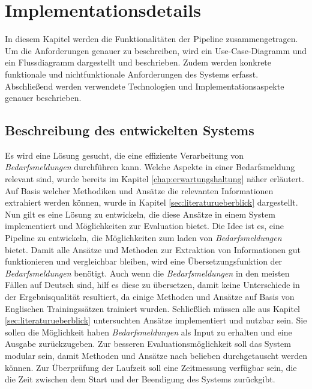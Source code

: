 \chapter{Implementationsdetails}
\label{chap:implementierung}
In diesem Kapitel werden die Funktionalitäten der Pipeline zusammengetragen. Um die Anforderungen genauer zu beschreiben, wird ein Use-Case-Diagramm und ein Flussdiagramm dargestellt und beschrieben. Zudem werden konkrete funktionale und nichtfunktionale Anforderungen des Systems erfasst. Abschließend werden verwendete Technologien und Implementationsaspekte genauer beschrieben.
\section{Beschreibung des entwickelten Systems}
\label{sec:beschreibungsystem}
Es wird eine Lösung gesucht, die eine effiziente Verarbeitung von \emph{Bedarfsmeldungen} durchführen kann. Welche Aspekte in einer Bedarfsmeldung relevant sind, wurde bereits im Kapitel \ref{chap:erwartungshaltung} näher erläutert. Auf Basis welcher Methodiken und Ansätze die relevanten Informationen extrahiert werden können, wurde in Kapitel \ref{sec:literaturueberblick} dargestellt. Nun gilt es eine Lösung zu entwickeln, die diese Ansätze in einem System implementiert und Möglichkeiten zur Evaluation bietet. Die Idee ist es, eine Pipeline zu entwickeln, die Möglichkeiten zum laden von \emph{Bedarfsmeldungen} bietet. Damit alle Ansätze und Methoden zur Extraktion von Informationen gut funktionieren und vergleichbar bleiben, wird eine Übersetzungsfunktion der \emph{Bedarfsmeldungen} benötigt. Auch wenn die \emph{Bedarfsmeldungen} in den meisten Fällen auf Deutsch sind, hilf es diese zu übersetzen, damit keine Unterschiede in der Ergebnisqualität resultiert, da einige Methoden und Ansätze auf Basis von Englischen Trainingssätzen trainiert wurden. Schließlich müssen alle aus Kapitel \ref{sec:literaturueberblick} untersuchten Ansätze implementiert und nutzbar sein. Sie sollen die Möglichkeit haben \emph{Bedarfsmeldungen} als Input zu erhalten und eine Ausgabe zurückzugeben. Zur besseren Evaluationsmöglichkeit soll das System modular sein, damit Methoden und Ansätze nach belieben durchgetauscht werden können. Zur Überprüfung der Laufzeit soll eine Zeitmessung verfügbar sein, die die Zeit zwischen dem Start und der Beendigung des Systems zurückgibt.\\

\newpage
